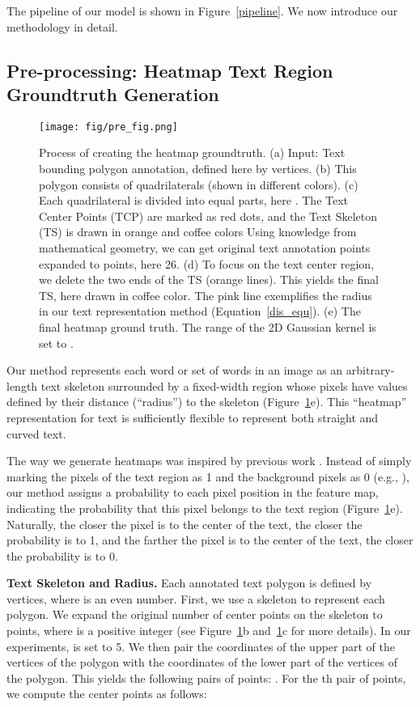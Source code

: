 \documentclass[10pt,twocolumn,letterpaper]{article}
\begin{document}
The pipeline of our model is shown in Figure~\ref{pipeline}.  We now introduce our methodology in detail.

\subsection{Pre-processing: Heatmap Text Region Groundtruth Generation}

\begin{figure}[tb]
\centering
\centering
\texttt{[image: fig/pre\_fig.png]}
\caption{Process of creating the heatmap groundtruth. (a) Input: Text bounding polygon annotation, defined here by  vertices. (b) This polygon consists of  quadrilaterals (shown in different colors).
(c) Each quadrilateral is divided into 
 equal parts, here . The Text Center Points (TCP) are marked as red dots, and 
the Text Skeleton (TS) is drawn in orange and coffee colors
 Using knowledge from mathematical geometry, we can get original text annotation points expanded to  points, here 26. 
(d) To focus on the text center region, we delete the two ends of the TS (orange lines). This yields the final TS, here drawn in coffee color. The pink line exemplifies the radius~ in our text representation method (Equation~\ref{dis_equ}). (e) The final heatmap ground truth. The range of the 2D Gaussian kernel is set to .}
\label{pre_fig}
\end{figure}

Our method represents each word or set of words in an image as an arbitrary-length text skeleton  surrounded by a fixed-width region whose pixels have values defined by their distance (``radius'') to the skeleton (Figure~\ref{pre_fig}e).  
 This ``heatmap'' representation for text is sufficiently flexible to represent both straight and curved text.  

The way we generate heatmaps was inspired by previous work \cite{craft,pose_estimation_16}. Instead of simply marking the pixels of the text region as 1 and the background pixels as 0 (e.g., \cite{textsnake,east}), our method assigns a probability to each pixel position in the feature map, indicating the probability that this pixel belongs to the text region (Figure~\ref{pre_fig}e). Naturally, the closer the pixel is to the center of the text, the closer the probability is to 1, and the farther the pixel is to the center of the text, the closer the probability is to 0.

\textbf{Text Skeleton and Radius.}  Each annotated text polygon is defined by  vertices, where  is an even number. First, we use a skeleton to represent each polygon.  We expand the original number of center points on the skeleton to  points, where  is a positive integer (see Figure~\ref{pre_fig}b and~\ref{pre_fig}c for more details). In our experiments,  is set to 5. We then pair the coordinates of the upper part of the vertices of the polygon with the coordinates of the lower part of the vertices of the polygon. This yields the following pairs of points: . For the th pair of points, we compute the center points as follows:
\end{document}
